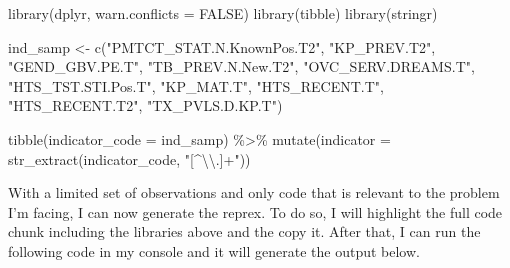 \documentclass[
  letterpaper,
  DIV=11,
  numbers=noendperiod]{scrreprt}
\newenvironment{Shaded}{\begin{snugshade}}{\end{snugshade}}
\newcommand{\AttributeTok}[1]{\textcolor[rgb]{0.40,0.45,0.13}{#1}}
\newcommand{\ConstantTok}[1]{\textcolor[rgb]{0.56,0.35,0.01}{#1}}
\newcommand{\FunctionTok}[1]{\textcolor[rgb]{0.28,0.35,0.67}{#1}}
\newcommand{\NormalTok}[1]{\textcolor[rgb]{0.00,0.23,0.31}{#1}}
\newcommand{\OtherTok}[1]{\textcolor[rgb]{0.00,0.23,0.31}{#1}}
\newcommand{\SpecialCharTok}[1]{\textcolor[rgb]{0.37,0.37,0.37}{#1}}
\newcommand{\StringTok}[1]{\textcolor[rgb]{0.13,0.47,0.30}{#1}}
\begin{document}
\begin{Shaded}
\begin{Highlighting}[]
\FunctionTok{library}\NormalTok{(dplyr, }\AttributeTok{warn.conflicts =} \ConstantTok{FALSE}\NormalTok{)}
\FunctionTok{library}\NormalTok{(tibble)}
\FunctionTok{library}\NormalTok{(stringr)}
 
\NormalTok{ind\_samp }\OtherTok{\textless{}{-}} \FunctionTok{c}\NormalTok{(}\StringTok{"PMTCT\_STAT.N.KnownPos.T2"}\NormalTok{, }\StringTok{"KP\_PREV.T2"}\NormalTok{, }\StringTok{"GEND\_GBV.PE.T"}\NormalTok{, }\StringTok{"TB\_PREV.N.New.T2"}\NormalTok{, }\StringTok{"OVC\_SERV.DREAMS.T"}\NormalTok{, }\StringTok{"HTS\_TST.STI.Pos.T"}\NormalTok{, }\StringTok{"KP\_MAT.T"}\NormalTok{, }\StringTok{"HTS\_RECENT.T"}\NormalTok{, }\StringTok{"HTS\_RECENT.T2"}\NormalTok{, }\StringTok{"TX\_PVLS.D.KP.T"}\NormalTok{)}

\FunctionTok{tibble}\NormalTok{(}\AttributeTok{indicator\_code =}\NormalTok{ ind\_samp) }\SpecialCharTok{\%\textgreater{}\%} 
  \FunctionTok{mutate}\NormalTok{(}\AttributeTok{indicator =} \FunctionTok{str\_extract}\NormalTok{(indicator\_code, }\StringTok{"[\^{}}\SpecialCharTok{\textbackslash{}\textbackslash{}}\StringTok{.]+"}\NormalTok{))}
\end{Highlighting}
\end{Shaded}

With a limited set of observations and only code that is relevant to the
problem I'm facing, I can now generate the reprex. To do so, I will
highlight the full code chunk including the libraries above and the copy
it. After that, I can run the following code in my console and it will
generate the output below.
\end{document}
